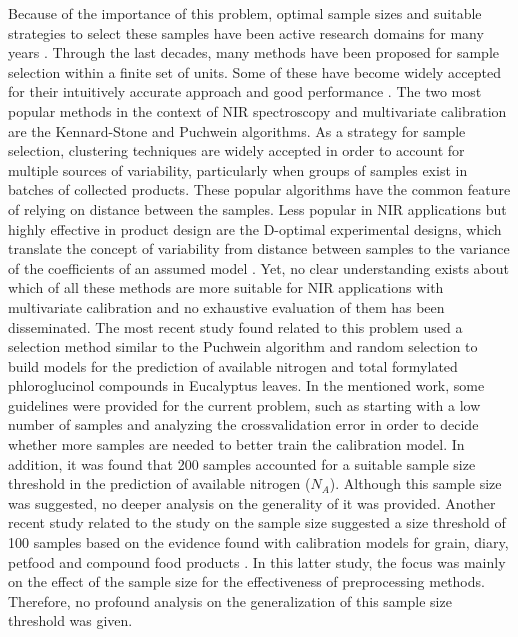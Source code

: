 \documentclass[preprint,12pt]{elsarticle}
\begin{document}
Because of the importance of this problem, optimal sample sizes and suitable strategies to select these samples have been active research domains for many years \cite{Ferre1996,Au2020, Liu2019}. Through the last decades, many methods have been proposed for sample selection within a finite set of units. Some of these have become widely accepted for their intuitively accurate approach and good performance \cite{Shetty2012a, Nawar2018, He2015}. The two most popular methods in the context of NIR spectroscopy and multivariate calibration are the Kennard-Stone\cite{Kennard1969} and  Puchwein\cite{Puchwein1988} algorithms. As a strategy for sample selection, clustering techniques are widely accepted in order to account for multiple sources of variability\cite{Naes1990}, particularly when groups of samples exist in batches of collected products\cite{Bobelyn2010}. These popular algorithms have the common feature of relying on distance between the samples. Less popular in NIR applications but highly effective in product design are the D-optimal experimental designs, which translate the concept of variability from distance between samples to the variance of the coefficients of an assumed model \cite{Goos2011}. Yet, no clear understanding exists about which of all these methods are more suitable for NIR applications with multivariate calibration and no exhaustive evaluation of them has been disseminated. The most recent study found related to this problem used a selection method similar to the Puchwein algorithm and random selection to build models for the prediction of available nitrogen and total formylated phloroglucinol compounds in Eucalyptus leaves\cite{Au2020}. In the mentioned work, some guidelines were provided for the current problem, such as starting with a low number of samples and analyzing the crossvalidation error in order to decide whether more samples are needed to better train the calibration model. In addition, it was found that 200 samples accounted for a suitable sample size threshold in the prediction of available nitrogen ($N_{A}$)\cite{Au2020}. Although this sample size was suggested, no deeper analysis on the generality of it was provided. Another recent study related to the study on the sample size suggested a size threshold of 100 samples based on the evidence found with calibration models for grain, diary, petfood and compound food products \cite{Schoot2020}. In this latter study, the focus was mainly on the effect of the sample size for the effectiveness of preprocessing methods. Therefore, no profound analysis on the generalization of this sample size threshold was given.
\end{document}
